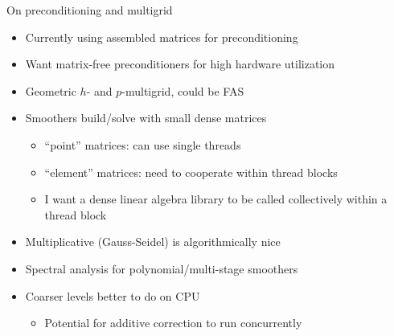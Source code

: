 \documentclass{beamer}
\begin{document}







\begin{frame}{On preconditioning and multigrid}
  \begin{itemize}
  \item Currently using assembled matrices for preconditioning
  \item Want matrix-free preconditioners for high hardware utilization
  \item Geometric $h$- and $p$-multigrid, could be FAS
  \item Smoothers build/solve with small dense matrices
    \begin{itemize}
    \item ``point'' matrices: can use single threads
    \item ``element'' matrices: need to cooperate within thread blocks
    \item I want a dense linear algebra library to be called collectively within a thread block
    \end{itemize}
  \item Multiplicative (Gauss-Seidel) is algorithmically nice
  \item Spectral analysis for polynomial/multi-stage smoothers
  \item Coarser levels better to do on CPU
    \begin{itemize}
    \item Potential for additive correction to run concurrently
    \end{itemize}
  \end{itemize}
\end{frame}
\end{document}
